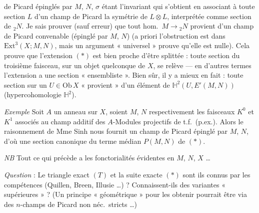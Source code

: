 \documentclass[11pt,a4paper]{article}
\begin{document}
  de Picard épinglés par $M$, $N$, $\sigma$
étant l'invariant qui s'obtient en associant à toute section $L$ d'un champ
de Picard la symétrie de \struck{\ill{}} $L \otimes L$, interprétée comme
section de ${}_2 N$. Je sais prouver (sauf erreur) que tout hom.\ $M \to
{}_2 N$ provient d'un champ de Picard convenable (épinglé par $M$, $N$)
(a priori l'obstruction est dans $\mathrm{Ext}^3(X; M, N)$, mais un
argument « universel » prouve qu'elle est nulle). Cela prouve que
l'extension $(*)$ est bien proche d'être splittée : toute section du
troisième faisceau, sur un objet quelconque de $X$, se relève --- en
d'autres termes l'extension a une section « ensembliste ». Bien sûr, il y a
mieux en fait : toute section sur un $U \in \mathrm{Ob}\, X$ « provient »
d'un élément de $\mathbb{H}^2(U, E'(M,N))$ (hypercohomologie
$\mathbb{H}^2$).


\emph{Exemple} Soit $A$ un anneau sur $X$, soient $M$, $N$ respectivement
les faisceaux $K^0$ et $K^1$ associés au champ additif des $A$-Modules
projectifs de t.f.\ (p.ex.). Alors le raisonnement de Mme Sinh nous fournit
un champ de Picard épinglé par $M$, $N$, d'où une section 
canonique du terme médian $P(M,N)$ de $(*)$.

\emph{NB} Tout ce qui précède a les fonctorialités évidentes en $M$, $N$,
$X$ …

\emph{Question} : Le triangle exact $(T)$ et la suite exacte $(*)$ sont
ils connus par les compétences (Quillen, Breen, Illusie …) ?
Connaissent-ils des variantes « supérieures » ? (Un principe
« géométrique » pour les obtenir pourrait être via des $n$-champs de Picard
non néc.\ stricts …)

\end{document}
